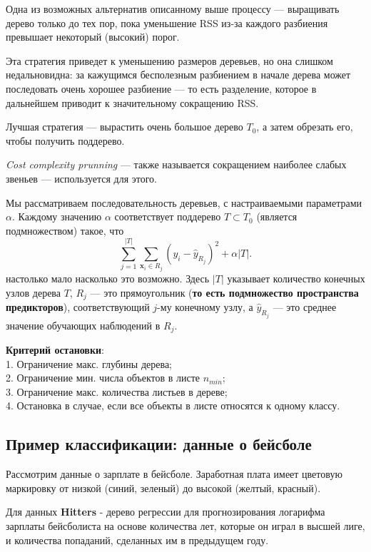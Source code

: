 \documentclass{article}
\begin{document}
Одна из возможных альтернатив описанному выше процессу --- выращивать дерево только до тех пор, пока уменьшение RSS из-за каждого разбиения превышает некоторый (высокий) порог.

Эта стратегия приведет к уменьшению размеров деревьев, но она слишком недальновидна: за кажущимся бесполезным разбиением в начале дерева может последовать очень хорошее разбиение --- то есть разделение, которое в дальнейшем приводит к значительному сокращению RSS.

Лучшая стратегия --- вырастить очень большое дерево $T_0$, а затем обрезать его, чтобы получить поддерево.

\textit{Cost complexity prunning} --- также называется сокращением наиболее слабых звеньев --- используется для этого.

Мы рассматриваем последовательность деревьев, с настраиваемыми параметрами $\alpha$. Каждому значению $\alpha$ соответствует поддерево $T \subset T_0$ (является подмножеством) такое, что
\begin{equation}
	\sum\limits_{j=1}^{|T|} \sum\limits_{\textbf{x}_i \in R_j}^{} (y_i - \hat{y}_{R_j})^2 + \alpha |T|.
\end{equation}
настолько мало насколько это возможно. Здесь $|T|$ указывает количество конечных узлов дерева $T$, $R_j$ --- это прямоугольник (\textbf{то есть подмножество пространства предикторов}), соответствующий $j$-му конечному узлу, а $\hat{y}_{R_j}$ --- это среднее значение обучающих наблюдений в $R_j$.

\textbf{Критерий остановки}:\\
1. Ограничение макс. глубины дерева;\\
2. Ограничение мин. числа объектов в листе $n_{min}$;\\
3. Ограничение макс. количества листьев в дереве;\\
4. Остановка в случае, если все объекты в листе относятся к одному классу.

\newpage

\subsection{Пример классификации: данные о бейсболе}

Рассмотрим данные о зарплате в бейсболе. Заработная плата имеет цветовую маркировку от низкой (синий, зеленый) до высокой (желтый, красный).

Для данных \textbf{Hitters} - дерево регрессии для прогнозирования логарифма зарплаты бейсболиста на основе количества лет, которые он играл в высшей лиге, и количества попаданий, сделанных им в предыдущем году.
\end{document}
